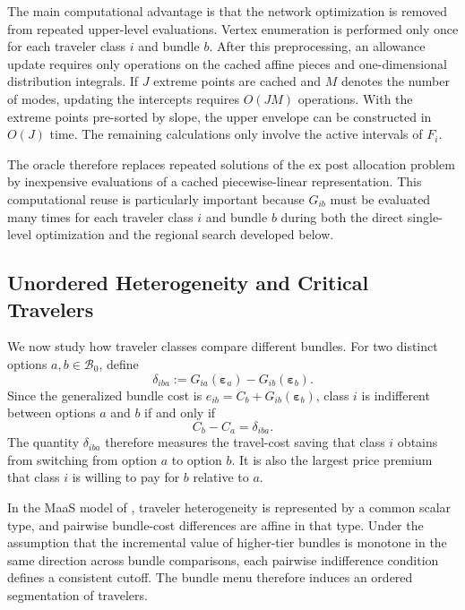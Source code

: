 \documentclass{article}
\begin{document}
The main computational advantage is that the network optimization is removed
from repeated upper-level evaluations. Vertex enumeration is performed only
once for each traveler class $i$ and bundle $b$. After this preprocessing, an allowance
update requires only operations on the cached affine pieces and
one-dimensional distribution integrals. If $J$ extreme points are cached and
$M$ denotes the number of modes, updating the intercepts requires
$O(JM)$ operations. With the extreme points pre-sorted by slope, the upper
envelope can be constructed in $O(J)$ time. The remaining calculations only
involve the active intervals of $F_i$.

The oracle therefore replaces repeated solutions of the ex post allocation
problem by inexpensive evaluations of a cached piecewise-linear
representation. This computational reuse is particularly important because
$G_{ib}$ must be evaluated many times for each traveler class $i$ and bundle $b$ during
both the direct single-level optimization and the regional search developed
below.

\subsection{Unordered Heterogeneity and Critical Travelers}
\label{sec:bundle-segmentation}

We now study how traveler classes compare different bundles. For two
distinct options $a,b\in\mathcal B_0$, define
\begin{equation}
    \delta_{iba}
    :=
    G_{ia}(\bm\varepsilon_a)
    -
    G_{ib}(\bm\varepsilon_b).
    \label{eq:pairwise-bundle-valuation}
\end{equation}
Since the generalized bundle cost is
$e_{ib}=C_b+G_{ib}(\bm\varepsilon_b)$, class $i$ is indifferent between
options $a$ and $b$ if and only if
\begin{equation}
    C_b-C_a
    =
    \delta_{iba}.
    \label{eq:pairwise-indifference}
\end{equation}
The quantity $\delta_{iba}$ therefore measures the travel-cost saving that
class $i$ obtains from switching from option $a$ to option $b$. It is
also the largest price premium that class $i$ is willing to pay for $b$
relative to $a$.

In the MaaS model of \citet{LiEtAlMaaSContinuous}, traveler heterogeneity is represented by a common scalar type, and pairwise bundle-cost differences are affine in that type. Under the assumption that the incremental value of higher-tier bundles is monotone in the same direction across bundle comparisons, each pairwise indifference condition defines a consistent cutoff. The bundle menu therefore induces an ordered segmentation of travelers.
\end{document}
